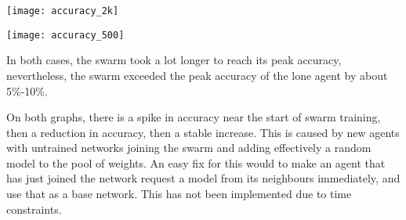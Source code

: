 \texttt{[image: accuracy\_2k]}

\texttt{[image: accuracy\_500]}

In both cases, the swarm took a lot longer to reach its peak accuracy, nevertheless, the swarm exceeded the peak accuracy of the lone agent by about 5\%-10\%.

On both graphs, there is a spike in accuracy near the start of swarm training, then a reduction in accuracy, then a stable increase. This is caused by new agents with untrained networks joining the swarm and adding effectively a random model to the pool of weights. An easy fix for this would to make an agent that has just joined the network request a model from its neighbours immediately, and use that as a base network. This has not been implemented due to time constraints. 